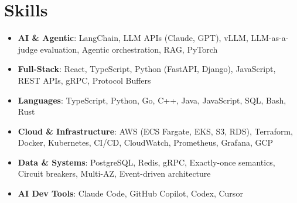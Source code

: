 \documentclass[letterpaper,11pt]{article}
\newcommand{\resumeSubHeadingListStart}{\begin{itemize}[leftmargin=0.15in, label={}]}
\newcommand{\resumeSubHeadingListEnd}{\end{itemize}}
\newcommand{\resumeSkillHeading}[2]{%
  \item\small{\textbf{#1}: #2 \vspace{-9pt}}%
}
\begin{document}
\section{Skills}
  \resumeSubHeadingListStart
    \resumeSkillHeading{AI \& Agentic}{LangChain, LLM APIs (Claude, GPT), vLLM, LLM-as-a-judge evaluation, Agentic orchestration, RAG, PyTorch}
    \resumeSkillHeading{Full-Stack}{React, TypeScript, Python (FastAPI, Django), JavaScript, REST APIs, gRPC, Protocol Buffers}
    \resumeSkillHeading{Languages}{TypeScript, Python, Go, C++, Java, JavaScript, SQL, Bash, Rust}
    \resumeSkillHeading{Cloud \& Infrastructure}{AWS (ECS Fargate, EKS, S3, RDS), Terraform, Docker, Kubernetes, CI/CD, CloudWatch, Prometheus, Grafana, GCP}
    \resumeSkillHeading{Data \& Systems}{PostgreSQL, Redis, gRPC, Exactly-once semantics, Circuit breakers, Multi-AZ, Event-driven architecture}
    \resumeSkillHeading{AI Dev Tools}{Claude Code, GitHub Copilot, Codex, Cursor}
  \resumeSubHeadingListEnd
\end{document}
